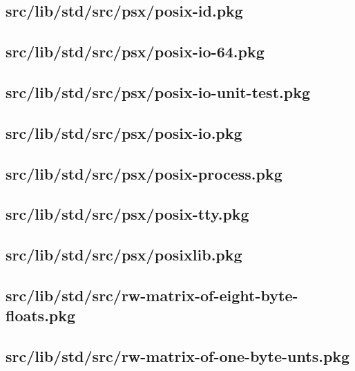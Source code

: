 \subsection{src/lib/std/src/psx/posix-id.pkg}


\subsection{src/lib/std/src/psx/posix-io-64.pkg}


\subsection{src/lib/std/src/psx/posix-io-unit-test.pkg}


\subsection{src/lib/std/src/psx/posix-io.pkg}


\subsection{src/lib/std/src/psx/posix-process.pkg}


\subsection{src/lib/std/src/psx/posix-tty.pkg}


\subsection{src/lib/std/src/psx/posixlib.pkg}


\subsection{src/lib/std/src/rw-matrix-of-eight-byte-floats.pkg}


\subsection{src/lib/std/src/rw-matrix-of-one-byte-unts.pkg}


